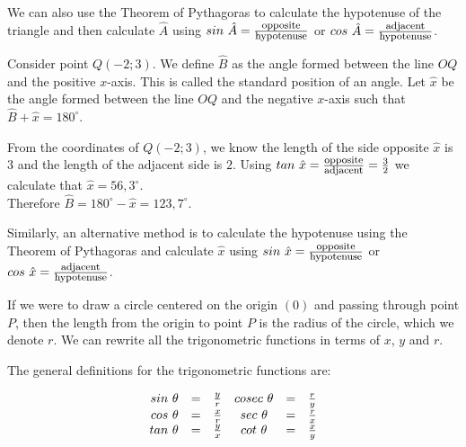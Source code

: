 We can also use the Theorem of Pythagoras to calculate the hypotenuse of the triangle and then calculate $\hat{A}$ using $sin~\hat{A} = \frac{\mbox{\footnotesize opposite}}{\mbox{\footnotesize hypotenuse}}$ or $cos~\hat{A} = \frac{\mbox{\footnotesize adjacent}}{\mbox{\footnotesize hypotenuse}}$. \par
Consider point $Q(-2;3)$. We define $\hat{B}$ as the angle formed between the line $OQ$ and the positive $x$-axis. This is called the standard position of an angle. Let $\hat{x}$ be the angle formed between the line $OQ$ and the negative $x$-axis such that $\hat{B} + \hat{x} = 180^{\circ}$.
\par

From the coordinates of $Q(-2;3)$, we know the length of the side opposite $\hat{x}$ is $3$ and the length of the adjacent side is $2$. Using $tan~\hat{x}=\frac{\mbox{\footnotesize opposite}}{\mbox{\footnotesize adjacent}} = \frac{3}{2}$ we calculate that $\hat{x}=56,3^{\circ}$.
\\Therefore $\hat{B}=180^{\circ} - \hat{x} = 123,7^{\circ}$.\par

Similarly, an alternative method is to calculate the hypotenuse using the Theorem of Pythagoras and calculate $\hat{x}$ using $sin~\hat{x} = \frac{\mbox{\footnotesize opposite}}{\mbox{\footnotesize hypotenuse}}$ or $cos~\hat{x} = \frac{\mbox{\footnotesize adjacent}}{\mbox{\footnotesize hypotenuse}}$. \par
If we were to draw a circle centered on the origin $(0)$ and passing through point $P$, then the length from the origin to point $P$ is the radius of the circle, which we denote $r$. We can rewrite all the trigonometric functions in terms of $x$, $y$ and $r$.


The general definitions for the trigonometric functions are:

\begin{equation*}
\begin{array}{cccccc}\hfill sin~\theta & =& \frac{y}{r}\hfill & cosec~\theta & =& \frac{r}{y}\hfill \\
 \hfill cos~\theta & =& \frac{x}{r}\hfill & sec~\theta & =& \frac{r}{x}\hfill \\
 \hfill tan~\theta & =& \frac{y}{x}\hfill & cot~\theta & =& \frac{x}{y}\hfill \end{array}
\end{equation*}

